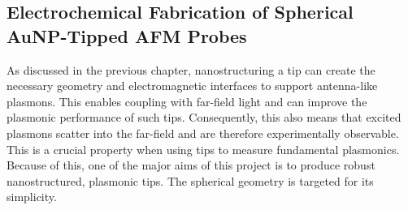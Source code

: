 \documentclass[12pt, a4paper, oneside]{book}
\begin{document}
\begin{singlespace}
\chapter{Electrochemical Fabrication of Spherical AuNP-Tipped AFM Probes}
\end{singlespace}


As discussed in the previous chapter, nanostructuring a tip can create the necessary geometry and electromagnetic interfaces to support antenna-like plasmons. This enables coupling with far-field light and can improve the plasmonic performance of such tips. Consequently, this also means that excited plasmons scatter into the far-field and are therefore experimentally observable. This is a crucial property when using tips to measure fundamental plasmonics. Because of this, one of the major aims of this project is to produce robust nanostructured, plasmonic tips. The spherical geometry is targeted for its simplicity.
\end{document}
